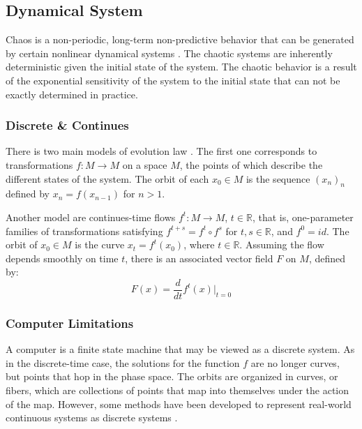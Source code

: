 \documentclass[twocolumn, a4paper, 10pt]{article}
\begin{document}

\subsection{Dynamical System}

Chaos is a non-periodic, long-term non-predictive behavior that can be generated by certain nonlinear dynamical systems \cite{Opac-b1101628}. The chaotic systems are inherently deterministic given the initial state of the system. The chaotic behavior is a result of the exponential sensitivity of the system to the initial state that can not be exactly determined in practice.

\subsubsection{Discrete \& Continues}

There is two main models of evolution law \cite{Viana2001}. The first one corresponds to transformations $f : M \to M$ on a space $M$, the points of which describe the different states of the system. The orbit of each $x_0 \in M$ is the sequence $(x_n)_n$ defined by $x_n = f(x_{n-1})$ for $n > 1$.

Another model are continues-time flows $f^t : M \to M$, $t \in \mathbb{R}$, that is, one-parameter families of transformations satisfying $f^{t+s} = f^t \circ f^s$ for $t, s \in \mathbb{R}$, and $f^0 = id$. The orbit of $x_0 \in M$ is the curve $x_t = f^t(x_0)$, where $t \in \mathbb{R}$. Assuming the flow depends smoothly on time $t$, there is an associated vector field $F$ on $M$, defined by: $$F(x) = \frac{d}{dt} f^t(x) \vert_{t=0}$$

\subsubsection{Computer Limitations}

A computer is a finite state machine that may be viewed as a discrete system. As in the discrete-time case, the solutions for the function $f$ are no longer curves, but points that hop in the phase space. The orbits are organized in curves, or fibers, which are collections of points that map into themselves under the action of the map. However, some methods have been developed to represent real-world continuous systems as discrete systems \cite{2014JChPh.140c4105T}.
\end{document}
